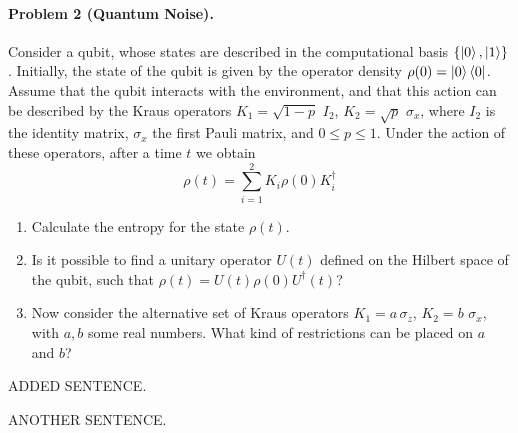 \documentclass[catalan,spanish,english]{exam}
\begin{document}
\paragraph{Problem 2 (Quantum Noise).}
Consider a qubit, whose states are described in the computational
basis $\{\left|0\right\rangle,\left|1\right\rangle\}$. Initially, the state of the qubit is given
by the operator density $\rho(0)=\left|0\right\rangle\left\langle 0\right|$. Assume that the qubit
interacts with the environment, and that this action can be described
by the Kraus operators $K_{1}=\sqrt{1-p}\,\,I_{2}$, $K_{2}=\sqrt{p}\,\,\sigma_{x}$,
where $I_{2}$ is the identity matrix, $\sigma_{x}$ the first Pauli
matrix, and $0\le p\le1$. Under the action of these operators, after
a time $t$ we obtain\foreignlanguage{spanish}{
\[
\rho(t)=\sum_{i=1}^{2}K_{i}\rho(0)K_{i}^{\dagger}
\]
}

\begin{enumerate}
    \item Calculate the entropy for the state $\rho(t)$. 
    \item Is it possible to
find a unitary operator $U(t)$ defined on the Hilbert space of the
qubit, such that $\rho(t)=U(t)\rho(0)U^{\dagger}(t)$? 

\item Now consider the alternative set of Kraus operators $K_{1}=a\,\sigma_{z}$,
$K_{2}=b\,\,\sigma_{x}$, with $a,b$ some real numbers. What kind
of restrictions can be placed on $a$ and $b$?
\end{enumerate}

ADDED SENTENCE.

ANOTHER SENTENCE.


\cite{skotiniotisQuantumMetrologyIsing2015}
\end{document}
